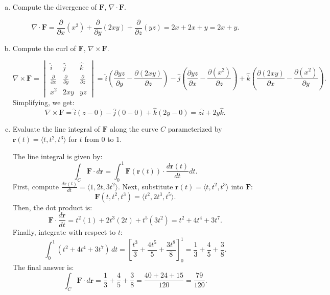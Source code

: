 \documentclass{article}
\begin{document}
\begin{enumerate}[a)]
  \item Compute the divergence of \( \mathbf{F} \), \( \nabla \cdot \mathbf{F} \).
  
  \[
  \nabla \cdot \mathbf{F} = \frac{\partial}{\partial x} (x^2) + \frac{\partial}{\partial y} (2xy) + \frac{\partial}{\partial z} (yz) = 2x + 2x + y = 2x + y.
  \]

  \item Compute the curl of \( \mathbf{F} \), \( \nabla \times \mathbf{F} \).
  
  \[
  \nabla \times \mathbf{F} = \begin{vmatrix} \hat{i} & \hat{j} & \hat{k} \\ \frac{\partial}{\partial x} & \frac{\partial}{\partial y} & \frac{\partial}{\partial z} \\ x^2 & 2xy & yz \end{vmatrix}
  = \hat{i} \left( \frac{\partial yz}{\partial y} - \frac{\partial (2xy)}{\partial z} \right) - \hat{j} \left( \frac{\partial yz}{\partial x} - \frac{\partial (x^2)}{\partial z} \right) + \hat{k} \left( \frac{\partial (2xy)}{\partial x} - \frac{\partial (x^2)}{\partial y} \right).
  \]
  Simplifying, we get:
  \[
  \nabla \times \mathbf{F} = \hat{i}(z - 0) - \hat{j}(0 - 0) + \hat{k}(2y - 0) = z \hat{i} + 2y \hat{k}.
  \]

  \item Evaluate the line integral of \( \mathbf{F} \) along the curve \( C \) parameterized by \( \mathbf{r}(t) = \langle t, t^2, t^3 \rangle \) for \( t \) from 0 to 1.
  
  The line integral is given by:
  \[
  \int_C \mathbf{F} \cdot d\mathbf{r} = \int_0^1 \mathbf{F}(\mathbf{r}(t)) \cdot \frac{d\mathbf{r}(t)}{dt} dt.
  \]
  First, compute \( \frac{d\mathbf{r}(t)}{dt} = \langle 1, 2t, 3t^2 \rangle \). Next, substitute \( \mathbf{r}(t) = \langle t, t^2, t^3 \rangle \) into \( \mathbf{F} \):
  \[
  \mathbf{F}(t, t^2, t^3) = \langle t^2, 2t^3, t^5 \rangle.
  \]
  Then, the dot product is:
  \[
  \mathbf{F} \cdot \frac{d\mathbf{r}}{dt} = t^2(1) + 2t^3(2t) + t^5(3t^2) = t^2 + 4t^4 + 3t^7.
  \]
  Finally, integrate with respect to \( t \):
  \[
  \int_0^1 (t^2 + 4t^4 + 3t^7) \, dt = \left[ \frac{t^3}{3} + \frac{4t^5}{5} + \frac{3t^8}{8} \right]_0^1 = \frac{1}{3} + \frac{4}{5} + \frac{3}{8}.
  \]
  The final answer is:
  \[
  \int_C \mathbf{F} \cdot d\mathbf{r} = \frac{1}{3} + \frac{4}{5} + \frac{3}{8} = \frac{40 + 24 + 15}{120} = \frac{79}{120}.
  \]
\end{enumerate}
\end{document}
